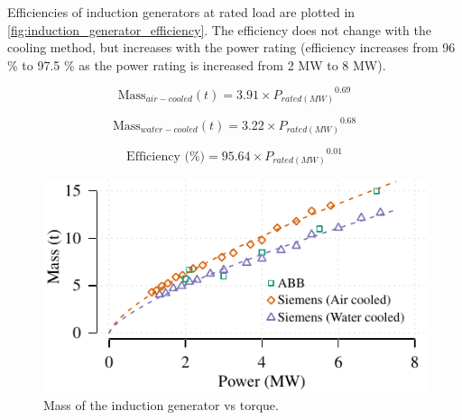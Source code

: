 \documentclass{article}\usepackage{graphicx, color}
\makeatletter
\def\maxwidth{ %
  \ifdim\Gin@nat@width>\linewidth
    \linewidth
  \else
    \Gin@nat@width
  \fi
}
\newenvironment{knitrout}{}{} %
\makeatother
\begin{document}
Efficiencies of induction generators at rated load are plotted in \autoref{fig:induction_generator_efficiency}. The efficiency does not change with the cooling method, but increases with the power rating (efficiency increases from 96 \% to 97.5 \% as the power rating is increased from 2 MW to 8 MW). 

\begin{equation}
  \text{Mass}_{air-cooled}(t) = 3.91 \times {P_{rated(MW)}}^{0.69}
  \label{mass-air}
\end{equation}

\begin{equation}
  \text{Mass}_{water-cooled}(t) = 3.22 \times {P_{rated(MW)}}^{0.68}
  \label{mass-water}
\end{equation}

\begin{equation}
\text{Efficiency (\%)} = 95.64 \times {P_{rated(MW)}}^{0.01}
\end{equation}


\begin{knitrout}
\color{fgcolor}\begin{figure}[]

\includegraphics[width=\maxwidth]{figure/induction_generator} \caption[Mass of the induction generator vs torque]{Mass of the induction generator vs torque.\label{fig:induction_generator}}
\end{figure}


\end{knitrout}
\end{document}

